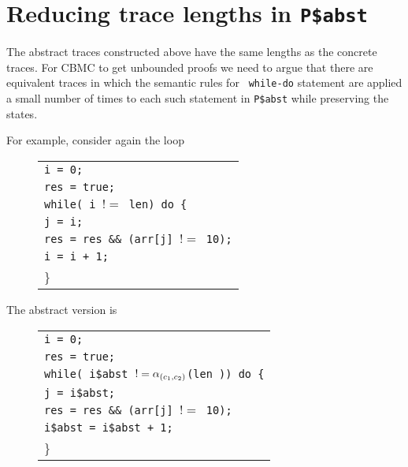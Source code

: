 \section{Reducing trace lengths in {\tt P\$abst}}

 The abstract traces constructed above have the same lengths as the
 concrete traces. For CBMC to get unbounded proofs we need to argue
 that there are equivalent traces in which the semantic rules for {\tt
   while-do} statement are applied a small number of times to each
 such statement in {\tt P\$abst} while preserving the states.
 
For example, consider again the loop

\begin{figure}[H]
  \centering
  \begin{tabular}{l}
    {\tt i = 0;} \\
    {\tt res = true;} \\
    {\tt while( i $!=$ len) do \{}  \\
    \hspace{1cm} {\tt j = i;} \\
    \hspace{1cm} {\tt res = res \&\& (arr[j] $!=$ 10);} \\
    \hspace{1cm}  {\tt i = i + 1;} \\
    \}\\
    \end{tabular}
\end{figure}

The abstract version is

\begin{figure}[H]
  \centering
  \begin{tabular}{l}
    {\tt i = 0;} \\
    {\tt res = true;} \\
    {\tt while( i\$abst $!= \alpha_{(c_1,c_2)}$(len )) do \{}  \\
    \hspace{1cm} {\tt j = i\$abst;} \\
    \hspace{1cm} {\tt res = res \&\& (arr[j] $!=$ 10);} \\
    \hspace{1cm}  {\tt i\$abst = i\$abst + 1;} \\
    \}\\
    \end{tabular}
\end{figure}

